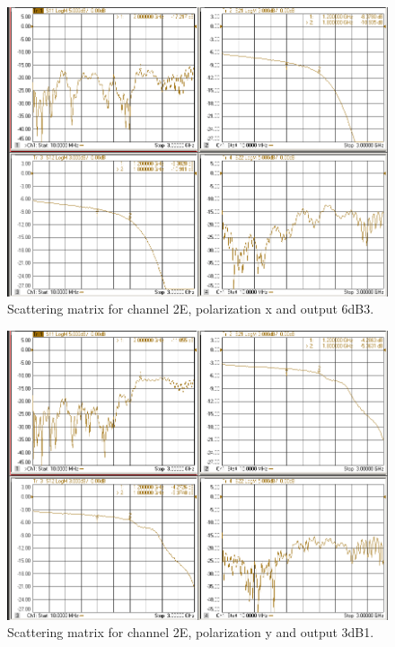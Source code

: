 \documentclass[12pt,a4paper,oneside]{article}
\begin{document}
\begin{figure}[H]
\centering
\includegraphics[width=0.9\linewidth]{VNA_results/2Ex_6dB3.png}
\caption{Scattering matrix for channel 2E, polarization x and output 6dB3.}
\label{fig:2Ex_6dB3}
\end{figure}


\begin{figure}[H]
\centering
\includegraphics[width=0.9\linewidth]{VNA_results/2Ey_3dB1.png}
\caption{Scattering matrix for channel 2E, polarization y and output 3dB1.}
\label{fig:2Ey_3dB1}
\end{figure}
\end{document}
